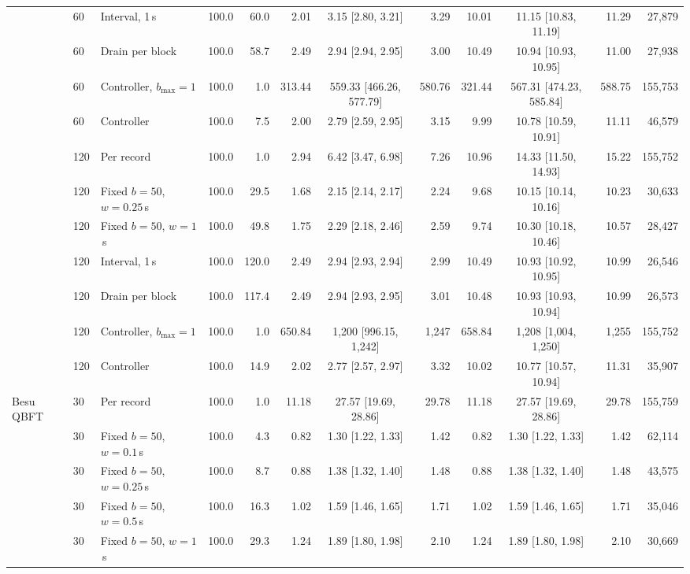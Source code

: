 \begin{table}[t]
\begin{adjustbox}{max width=\textwidth}
\begin{tabular}{lllrrrcrrcrr}
 & 60 & Interval, 1\,s & 100.0 & 60.0 & 2.01 & 3.15 [2.80, 3.21] & 3.29 & 10.01 & 11.15 [10.83, 11.19] & 11.29 & 27,879 \\
 & 60 & Drain per block & 100.0 & 58.7 & 2.49 & 2.94 [2.94, 2.95] & 3.00 & 10.49 & 10.94 [10.93, 10.95] & 11.00 & 27,938 \\
 & 60 & Controller, $b_{\max}{=}1$ & 100.0 & 1.0 & 313.44 & 559.33 [466.26, 577.79] & 580.76 & 321.44 & 567.31 [474.23, 585.84] & 588.75 & 155,753 \\
 & 60 & Controller & 100.0 & 7.5 & 2.00 & 2.79 [2.59, 2.95] & 3.15 & 9.99 & 10.78 [10.59, 10.91] & 11.11 & 46,579 \\
 & 120 & Per record & 100.0 & 1.0 & 2.94 & 6.42 [3.47, 6.98] & 7.26 & 10.96 & 14.33 [11.50, 14.93] & 15.22 & 155,752 \\
 & 120 & Fixed $b{=}50$, $w{=}0.25$\,s & 100.0 & 29.5 & 1.68 & 2.15 [2.14, 2.17] & 2.24 & 9.68 & 10.15 [10.14, 10.16] & 10.23 & 30,633 \\
 & 120 & Fixed $b{=}50$, $w{=}1$\,s & 100.0 & 49.8 & 1.75 & 2.29 [2.18, 2.46] & 2.59 & 9.74 & 10.30 [10.18, 10.46] & 10.57 & 28,427 \\
 & 120 & Interval, 1\,s & 100.0 & 120.0 & 2.49 & 2.94 [2.93, 2.94] & 2.99 & 10.49 & 10.93 [10.92, 10.95] & 10.99 & 26,546 \\
 & 120 & Drain per block & 100.0 & 117.4 & 2.49 & 2.94 [2.93, 2.95] & 3.01 & 10.48 & 10.93 [10.93, 10.94] & 10.99 & 26,573 \\
 & 120 & Controller, $b_{\max}{=}1$ & 100.0 & 1.0 & 650.84 & 1,200 [996.15, 1,242] & 1,247 & 658.84 & 1,208 [1,004, 1,250] & 1,255 & 155,752 \\
 & 120 & Controller & 100.0 & 14.9 & 2.02 & 2.77 [2.57, 2.97] & 3.32 & 10.02 & 10.77 [10.57, 10.94] & 11.31 & 35,907 \\
Besu QBFT & 30 & Per record & 100.0 & 1.0 & 11.18 & 27.57 [19.69, 28.86] & 29.78 & 11.18 & 27.57 [19.69, 28.86] & 29.78 & 155,759 \\
 & 30 & Fixed $b{=}50$, $w{=}0.1$\,s & 100.0 & 4.3 & 0.82 & 1.30 [1.22, 1.33] & 1.42 & 0.82 & 1.30 [1.22, 1.33] & 1.42 & 62,114 \\
 & 30 & Fixed $b{=}50$, $w{=}0.25$\,s & 100.0 & 8.7 & 0.88 & 1.38 [1.32, 1.40] & 1.48 & 0.88 & 1.38 [1.32, 1.40] & 1.48 & 43,575 \\
 & 30 & Fixed $b{=}50$, $w{=}0.5$\,s & 100.0 & 16.3 & 1.02 & 1.59 [1.46, 1.65] & 1.71 & 1.02 & 1.59 [1.46, 1.65] & 1.71 & 35,046 \\
 & 30 & Fixed $b{=}50$, $w{=}1$\,s & 100.0 & 29.3 & 1.24 & 1.89 [1.80, 1.98] & 2.10 & 1.24 & 1.89 [1.80, 1.98] & 2.10 & 30,669 \\

\end{tabular}
\end{adjustbox}
\end{table}
